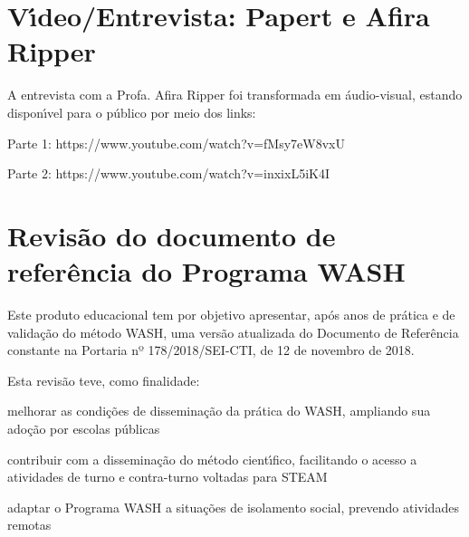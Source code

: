 \documentclass[
12pt,		%
openright,	%
twoside,  %
a4paper,			%
chapter=TITLE,		%
english,			%
french,				%
spanish,			%
brazil				%
]{USPSC-classe/USPSC}
\begin{document}
\section[V\'{\i}deo/Entrevista: Papert e Afira Ripper]{V\'{\i}deo/Entrevista: Papert e Afira Ripper}\label{V\'{\i}deo/Entrevista: Papert e Afira Ripper}
A entrevista com a Profa. Afira Ripper foi transformada em \'audio-visual, estando dispon\'{\i}vel para o p\'ublico por meio dos links:










\begin{alineas}
\item Parte 1: https://www.youtube.com/watch?v=fMsy7eW8vxU
\item Parte 2: https://www.youtube.com/watch?v=inxixL5iK4I
\end{alineas}

\section[Revis\~ao do documento de refer\^encia do Programa WASH]{Revis\~ao do documento de refer\^encia do Programa WASH}\label{Revis\~ao do documento de refer\^encia do Programa WASH}
Este produto educacional tem por objetivo apresentar, ap\'os anos de pr\'atica e de valida\c{c}\~ao do m\'etodo WASH, uma vers\~ao atualizada do Documento de Refer\^encia constante na Portaria nº 178/2018/SEI-CTI, de 12 de novembro de 2018.









Esta revis\~ao teve, como finalidade:










\begin{alineas}
\item melhorar as condi\c{c}\~oes de dissemina\c{c}\~ao da pr\'atica do WASH, ampliando sua ado\c{c}\~ao por escolas p\'ublicas
\item contribuir com a dissemina\c{c}\~ao do m\'etodo cient\'{\i}fico, facilitando o acesso a atividades de turno e contra-turno voltadas para STEAM
\item adaptar o Programa WASH a situa\c{c}\~oes de isolamento social, prevendo atividades remotas
\end{alineas}
\end{document}
